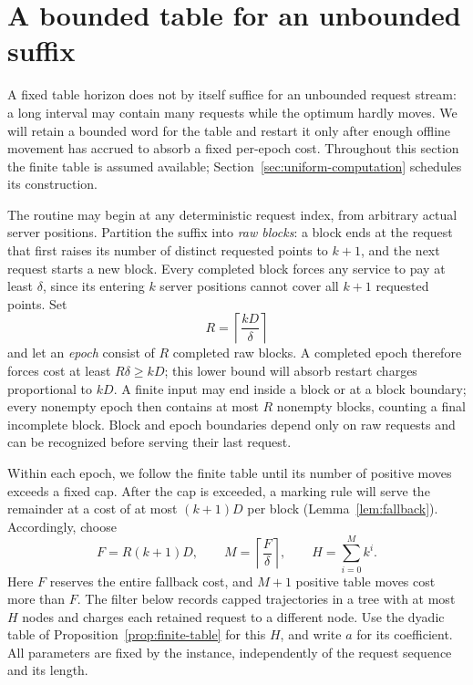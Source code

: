 \section{A bounded table for an unbounded suffix}
\label{sec:bounded-suffix}

A fixed table horizon does not by itself suffice for an unbounded request
stream: a long interval may contain many requests while the optimum hardly
moves. We will retain a bounded word for the table and restart it only after
enough offline movement has accrued to absorb a fixed per-epoch cost.
Throughout this section the finite table is assumed available;
Section~\ref{sec:uniform-computation} schedules its construction.

The routine may begin at any deterministic request index, from arbitrary
actual server positions.  Partition the suffix into \emph{raw blocks}:
a block ends at the request that first raises its number of distinct
requested points to $k+1$, and the next request starts a new block.
Every completed block forces any service to pay at least $\delta$, since
its entering $k$ server positions cannot cover all $k+1$ requested points.
Set
\begin{equation}\label{eq:epoch-length}
 R=\left\lceil\frac{kD}{\delta}\right\rceil
\end{equation}
and let an \emph{epoch} consist of $R$ completed raw blocks. A completed
epoch therefore forces cost at least $R\delta\ge kD$; this lower bound
will absorb restart charges proportional to $kD$. A finite input may end inside a
block or at a block boundary; every nonempty epoch then contains at most
$R$ nonempty blocks, counting a final incomplete block. Block and epoch
boundaries depend only on raw requests and can be recognized before
serving their last request.

Within each epoch, we follow the finite table until its number of positive
moves exceeds a fixed cap. After the cap is exceeded, a marking rule will
serve the remainder at a cost of at most $(k+1)D$ per block
(Lemma~\ref{lem:fallback}). Accordingly, choose
\begin{equation}\label{eq:suffix-parameters}
 F=R(k+1)D,\qquad
 M=\left\lceil\frac{F}{\delta}\right\rceil,\qquad
 H=\sum_{i=0}^{M}k^i.
\end{equation}
Here $F$ reserves the entire fallback cost, and $M+1$ positive table moves
cost more than $F$. The filter below records capped trajectories in a tree
with at most $H$ nodes and charges each retained request to a different
node. Use the dyadic table of Proposition~\ref{prop:finite-table} for this
$H$, and write $a$ for its coefficient. All parameters are fixed by the
instance, independently of the request sequence and its length.

